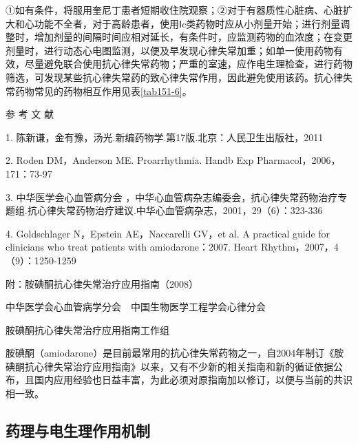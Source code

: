 ①如有条件，将服用奎尼丁患者短期收住院观察；②对于有器质性心脏病、心脏扩大和心功能不全者，对于高龄患者，使用Ⅰc类药物时应从小剂量开始；进行剂量调整时，增加剂量的间隔时间应相对延长，有条件时，应监测药物的血浓度；在变更剂量时，进行动态心电图监测，以便及早发现心律失常加重；如单一使用药物有效，尽量避免联合使用抗心律失常药物；严重的室速，应作电生理检查，进行药物筛选，可发现某些抗心律失常药的致心律失常作用，因此避免使用该药。抗心律失常药物常见的药物相互作用见表\ref{tab151-6}。

\protect\hypertarget{text00424.html}{}{}

\hypertarget{text00424.htmlux5cux23CHP17-4-6}{}
参 考 文 献

1. 陈新谦，金有豫，汤光.新编药物学.第17版.北京：人民卫生出版社，2011

2. Roden DM，Anderson ME. Proarrhythmia. Handb Exp
Pharmacol，2006，171：73-97

3. 中华医学会心血管病分会
，中华心血管病杂志编委会，抗心律失常药物治疗专题组.抗心律失常药物治疗建议.中华心血管病杂志，2001，29（6）：323-336

4. Goldschlager N，Epstein AE，Naccarelli GV，et al. A practical guide
for clinicians who treat patients with amiodarone：2007. Heart
Rhythm，2007，4（9）：1250-1259

\protect\hypertarget{text00425.html}{}{}

\hypertarget{text00425.htmlux5cux23CHP17-4-7}{}
附：胺碘酮抗心律失常治疗应用指南（2008）

中华医学会心血管病学分会　中国生物医学工程学会心律分会

胺碘酮抗心律失常治疗应用指南工作组

胺碘酮（amiodarone）是目前最常用的抗心律失常药物之一，自2004年制订《胺碘酮抗心律失常治疗应用指南》以来，又有不少新的相关指南和新的循证依据公布，且国内应用经验也日益丰富，为此必须对原指南加以修订，以便与当前的共识相一致。

\subsection{药理与电生理作用机制}

